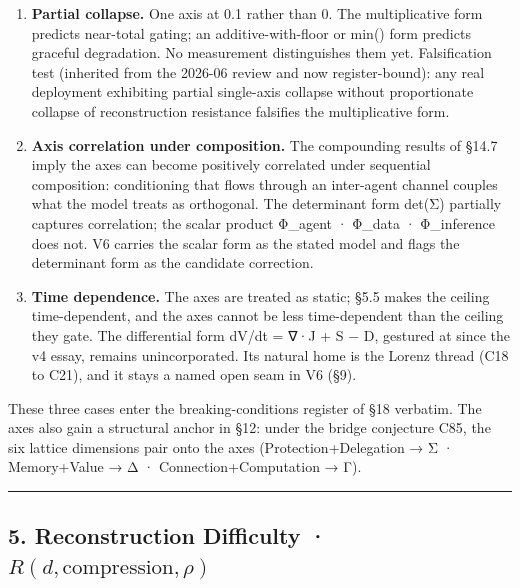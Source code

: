 \documentclass[
]{article}
\providecommand{\tightlist}{%
  \setlength{\itemsep}{0pt}\setlength{\parskip}{0pt}}
\begin{document}
\begin{enumerate}
\def\labelenumi{\arabic{enumi}.}
\tightlist
\item
  \textbf{Partial collapse.} One axis at 0.1 rather than 0. The
  multiplicative form predicts near-total gating; an additive-with-floor
  or min() form predicts graceful degradation. No measurement
  distinguishes them yet. Falsification test (inherited from the 2026-06
  review and now register-bound): any real deployment exhibiting partial
  single-axis collapse without proportionate collapse of reconstruction
  resistance falsifies the multiplicative form.
\item
  \textbf{Axis correlation under composition.} The compounding results
  of §14.7 imply the axes can become positively correlated under
  sequential composition: conditioning that flows through an inter-agent
  channel couples what the model treats as orthogonal. The determinant
  form det(Σ) partially captures correlation; the scalar product
  Φ\_agent · Φ\_data · Φ\_inference does not. V6 carries the scalar form
  as the stated model and flags the determinant form as the candidate
  correction.
\item
  \textbf{Time dependence.} The axes are treated as static; §5.5 makes
  the ceiling time-dependent, and the axes cannot be less time-dependent
  than the ceiling they gate. The differential form dV/dt = ∇·J + S − D,
  gestured at since the v4 essay, remains unincorporated. Its natural
  home is the Lorenz thread (C18 to C21), and it stays a named open seam
  in V6 (§9).
\end{enumerate}

These three cases enter the breaking-conditions register of §18
verbatim. The axes also gain a structural anchor in §12: under the
bridge conjecture C85, the six lattice dimensions pair onto the axes
(Protection+Delegation → Σ · Memory+Value → Δ · Connection+Computation →
Γ).

\begin{center}\rule{0.5\linewidth}{0.5pt}\end{center}

\subsection{\texorpdfstring{5. Reconstruction Difficulty ·
\(R(d, \text{compression}, \rho)\)}{5. Reconstruction Difficulty · R(d, \textbackslash text\{compression\}, \textbackslash rho)}}\label{reconstruction-difficulty-rd-textcompression-rho}
\end{document}

